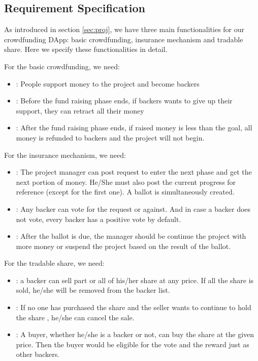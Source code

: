 \documentclass{article}
\begin{document}
\subsection{Requirement Specification}
As introduced in section \ref{sec:proj}, we have three main functionalities for our crowdfunding DApp: basic crowdfunding, insurance mechanism and tradable share. Here we specify these functionalities in detail.

For the basic crowdfunding, we need:
\begin{itemize}
    \item {}: People support money to the project and become backers
    \item {}: Before the fund raising phase ends, if backers wants to give up their support, they can retract all their money
    \item {}: After the fund raising phase ends, if raised money is less than the goal, all money is refunded to backers and the project will not begin.
\end{itemize}

For the insurance mechanism, we need:
\begin{itemize}
    \item {}: The project manager can post request to enter the next phase and get the next portion of money. He/She must also post the current progress for reference (except for the first one). A ballot is simultaneously created. 
    \item {}: Any backer can vote for the request or against. And in case a backer does not vote, every backer has a positive vote by default.
    \item {}: After the ballot is due, the manager should be continue the project with more money or suspend the project  based on the result of the ballot.
\end{itemize}

For the tradable share, we need:
\begin{itemize}
    \item {}: a backer can sell part or all of his/her share at any price. If all the share is sold, he/she will be removed from the backer list.
    \item {}: If no one has purchased the share and the seller wants to continue to hold the share , he/she can cancel the sale.
    \item {}: A buyer, whether he/she is a backer or not, can buy the share at the given price. Then the buyer would be eligible for the vote and the reward just as other backers.
\end{itemize}
\end{document}
